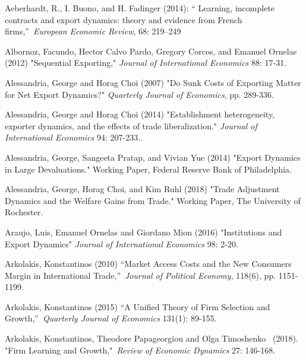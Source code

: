 \documentclass[12pt]{article}
\begin{document}
\begin{description}
\item Aeberhardt, R., I. Buono, and H. Fadinger (2014): \textquotedblleft
Learning, incomplete contracts and export dynamics: theory and evidence from
French firms,\textquotedblright\ \textit{European Economic Review}, 68:
219--249

\item Albornoz, Facundo, Hector Calvo Pardo, Gregory Corcos, and Emanuel
Ornelas (2012) "Sequential Exporting," \textit{Journal of International
Economics} 88: 17-31.

\item Alessandria, George and Horag Choi (2007) "Do Sunk Costs of Exporting
Matter for Net Export Dynamics?" \textit{Quarterly Journal of Economics},
pp. 289-336.

\item Alessandria, George and Horag Choi (2014) "Establishment
heterogeneity, exporter dynamics, and the effects of trade liberalization." 
\textit{Journal of International Economics} 94: 207-233..

\item Alessandria, George, Sangeeta Pratap, and Vivian Yue (2014) "Export
Dynamics in Large Devaluations." Working Paper, Federal Reserve Bank of
Philadelphia.

\item Alessandria, George, Horag Choi, and Kim Ruhl (2018) "Trade Adjustment
Dynamics and the Welfare Gains from Trade." Working Paper, The University of
Rochester.

\item Araujo, Luis, Emanuel Ornelas and Giordano Mion (2016) "Institutions
and Export Dynamics" \textit{Journal of International Economics }98: 2-20.

\item Arkolakis, Konstantinos (2010) \textquotedblleft Market Access Costs
and the New Consumers Margin in International Trade,\textquotedblright\ 
\textit{Journal of Political Economy}, 118(6), pp. 1151-1199.

\item Arkolakis, Konstantinos (2015) \textquotedblleft A Unified Theory of
Firm Selection and Growth,\textquotedblright\ \textit{Quarterly Journal of
Economics} 131(1): 89-155.

\item Arkolakis, Konstantinos, Theodore Papageorgiou and Olga Timoshenko \
(2018). "Firm Learning and Growth,"\textit{\ Review of Economic Dynamics}
27: 146-168.


\end{description}
\end{document}
